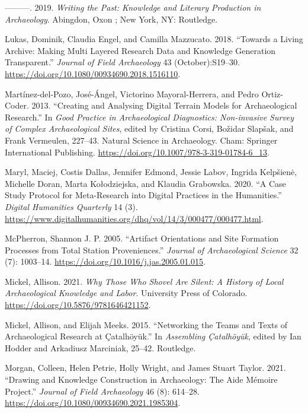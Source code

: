 \documentclass[
]{article}
\newlength{\cslhangindent}
\newenvironment{CSLReferences}[2] %
 {\begin{list}{}{%
  \setlength{\itemindent}{0pt}
  \setlength{\leftmargin}{0pt}
  \setlength{\parsep}{0pt}
  \ifodd #1
   \setlength{\leftmargin}{\cslhangindent}
   \setlength{\itemindent}{-1\cslhangindent}
  \fi
  \setlength{\itemsep}{#2\baselineskip}}}
 {\end{list}}
\begin{document}
\begin{CSLReferences}{1}{0}
---------. 2019. \emph{Writing the Past: {Knowledge} and Literary
Production in Archaeology}. Abingdon, Oxon ; New York, NY: Routledge.

Lukas, Dominik, Claudia Engel, and Camilla Mazzucato. 2018. {``Towards a
{Living Archive}: {Making Multi Layered Research Data} and {Knowledge
Generation Transparent}.''} \emph{Journal of Field Archaeology} 43
(October):S19--30. \url{https://doi.org/10.1080/00934690.2018.1516110}.

Martínez-del-Pozo, José-Ángel, Victorino Mayoral-Herrera, and Pedro
Ortiz-Coder. 2013. {``Creating and {Analysing Digital Terrain Models}
for {Archaeological Research}.''} In \emph{Good {Practice} in
{Archaeological Diagnostics}: {Non-invasive Survey} of {Complex
Archaeological Sites}}, edited by Cristina Corsi, Božidar Slapšak, and
Frank Vermeulen, 227--43. Natural {Science} in {Archaeology}. Cham:
Springer International Publishing.
\url{https://doi.org/10.1007/978-3-319-01784-6_13}.

Maryl, Maciej, Costis Dallas, Jennifer Edmond, Jessie Labov, Ingrida
Kelpšienė, Michelle Doran, Marta Kołodziejska, and Klaudia Grabowska.
2020. {``A {Case Study Protocol} for {Meta-Research} into {Digital
Practices} in the {Humanities}.''} \emph{Digital Humanities Quarterly}
14 (3).
\url{https://www.digitalhumanities.org/dhq/vol/14/3/000477/000477.html}.

McPherron, Shannon J. P. 2005. {``Artifact Orientations and Site
Formation Processes from Total Station Proveniences.''} \emph{Journal of
Archaeological Science} 32 (7): 1003--14.
\url{https://doi.org/10.1016/j.jas.2005.01.015}.

Mickel, Allison. 2021. \emph{Why {Those Who Shovel Are Silent}: {A
History} of {Local Archaeological Knowledge} and {Labor}}. University
Press of Colorado. \url{https://doi.org/10.5876/9781646421152}.

Mickel, Allison, and Elijah Meeks. 2015. {``Networking the Teams and
Texts of Archaeological Research at {Çatalhöyük}.''} In \emph{Assembling
{Çatalhöyük}}, edited by Ian Hodder and Arkadiusz Marciniak, 25--42.
Routledge.

Morgan, Colleen, Helen Petrie, Holly Wright, and James Stuart Taylor.
2021. {``Drawing and {Knowledge Construction} in {Archaeology}: {The
Aide Mémoire Project}.''} \emph{Journal of Field Archaeology} 46 (8):
614--28. \url{https://doi.org/10.1080/00934690.2021.1985304}.


\end{CSLReferences}
\end{document}
